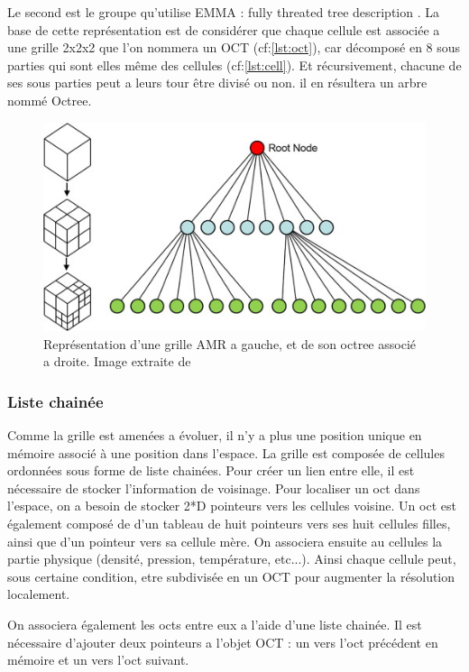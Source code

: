 Le second est le groupe qu'utilise EMMA : fully threated tree description \citep{khokhlov_fully_1998-1}.
La base de cette représentation est de considérer que chaque cellule est associée a une grille 2x2x2 que l'on nommera un OCT (cf:\ref{lst:oct}), car décomposé en 8 sous parties qui sont elles même des cellules (cf:\ref{lst:cell}).
Et récursivement, chacune de ses sous parties peut a leurs tour être divisé ou non.
il en résultera un arbre nommé Octree.

\begin{figure}[bth]
        \includegraphics[width=.95\linewidth]{img/02/octree.jpg} 
        \caption{Représentation d'une grille AMR a gauche, et de son octree associé a droite. 
        Image extraite de \cite{SU201659}
}
 		\label{fig:octree}
\end{figure}

\subsubsection{Liste chainée}

Comme la grille est amenées a évoluer, il n'y a plus une position unique en mémoire associé à une position dans l'espace.
La grille est composée de cellules ordonnées sous forme de liste chainées.
Pour créer un lien entre elle, il est nécessaire de stocker l'information de voisinage.
Pour localiser un oct dans l'espace, on a besoin de stocker 2*D pointeurs vers les cellules voisine.
Un oct est également composé de d'un tableau de huit pointeurs vers ses huit cellules filles,  ainsi que d'un pointeur vers sa cellule mère.
On associera ensuite au cellules la partie physique (densité, pression, température, etc...).
Ainsi chaque cellule peut, sous certaine condition, etre subdivisée en un OCT pour augmenter la résolution localement.


On associera également les octs entre eux a l'aide d'une liste chainée. 
Il est nécessaire d'ajouter deux pointeurs a l'objet OCT : un vers l'oct précédent en mémoire et un vers l'oct suivant.

